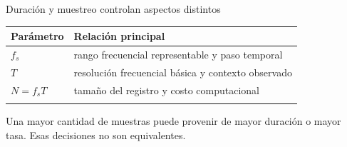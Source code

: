 \documentclass[
  ignorenonframetext,
  aspectratio=169,
  spanish,
]{beamer}
\providecommand{\faExclamation}{\faIcon{exclamation}}
\newcounter{none} %
\begin{document}
\begin{frame}{Duración y muestreo controlan aspectos distintos}
  \protect{}\label{duraciuxf3n-y-muestreo-controlan-aspectos-distintos}
  {\def\LTcaptype{none} %
    \begin{longtable}[]{@{}ll@{}}
      \toprule\noalign{}
      Parámetro  & Relación principal                                 \\
      \midrule\noalign{}
      \endhead
      \(f_s\)    & rango frecuencial representable y paso temporal    \\
      \(T\)      & resolución frecuencial básica y contexto observado \\
      \(N=f_sT\) & tamaño del registro y costo computacional          \\
      \bottomrule\noalign{}
    \end{longtable}
  }

  \begin{tcolorbox}[enhanced jigsaw, arc=.35mm, bottomrule=.15mm, bottomtitle=1mm, breakable, colback=white, colbacktitle=quarto-callout-important-color!10!white, colframe=quarto-callout-important-color-frame, coltitle=black, left=2mm, leftrule=.75mm, opacityback=0, opacitybacktitle=0.6, rightrule=.15mm, title=\textcolor{quarto-callout-important-color}{\faExclamation}\hspace{0.5em}{Importante}, titlerule=0mm, toprule=.15mm, toptitle=1mm]

    Una mayor cantidad de muestras puede provenir de mayor duración o mayor
    tasa. Esas decisiones no son equivalentes.

  \end{tcolorbox}
\end{frame}
\end{document}
